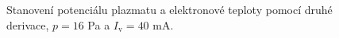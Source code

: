 \documentclass[a4paper,12pt]{article}
\begin{document}
\newpage
\begin{figure}[h!]
	\centering
	\begin{subfigure}[b]{.49\textwidth}
		\centering
	\end{subfigure}
	\begin{subfigure}[b]{.49\textwidth}
		\centering
	\end{subfigure}
	\caption{Stanovení potenciálu plazmatu a elektronové teploty pomocí druhé 
	derivace, $p = 16$ 
	\si{\pascal} a $I_\text{v} = 40$ \si{\milli\ampere}.}
	\label{data6sec}
\end{figure}
\end{document}
